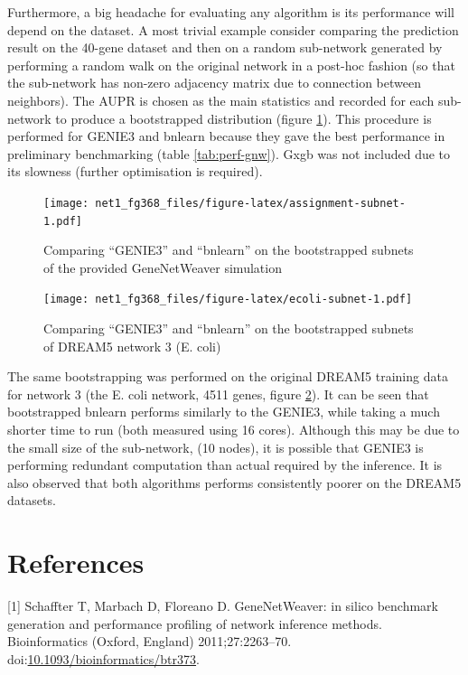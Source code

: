 \documentclass[]{article}
\theoremstyle{definition}
\theoremstyle{definition}
\theoremstyle{definition}
\theoremstyle{remark}
\begin{document}
Furthermore, a big headache for evaluating any algorithm is its
performance will depend on the dataset. A most trivial example consider
comparing the prediction result on the 40-gene dataset and then on a
random sub-network generated by performing a random walk on the original
network in a post-hoc fashion (so that the sub-network has non-zero
adjacency matrix due to connection between neighbors). The AUPR is
chosen as the main statistics and recorded for each sub-network to
produce a bootstrapped distribution (figure
\ref{fig:assignment-subnet}). This procedure is performed for GENIE3 and
bnlearn because they gave the best performance in preliminary
benchmarking (table \ref{tab:perf-gnw}). Gxgb was not included due to
its slowness (further optimisation is required).

\begin{figure}
\centering
\texttt{[image: net1\_fg368\_files/figure-latex/assignment-subnet-1.pdf]}
\caption{\label{fig:assignment-subnet}Comparing ``GENIE3'' and ``bnlearn''
on the bootstrapped subnets of the provided GeneNetWeaver simulation}
\end{figure}

\begin{figure}
\centering
\texttt{[image: net1\_fg368\_files/figure-latex/ecoli-subnet-1.pdf]}
\caption{\label{fig:ecoli-subnet}Comparing ``GENIE3'' and ``bnlearn'' on the
bootstrapped subnets of DREAM5 network 3 (E. coli)}
\end{figure}

The same bootstrapping was performed on the original DREAM5 training
data for network 3 (the E. coli network, 4511 genes, figure
\ref{fig:ecoli-subnet}). It can be seen that bootstrapped bnlearn
performs similarly to the GENIE3, while taking a much shorter time to
run (both measured using 16 cores). Although this may be due to the
small size of the sub-network, (10 nodes), it is possible that GENIE3 is
performing redundant computation than actual required by the inference.
It is also observed that both algorithms performs consistently poorer on
the DREAM5 datasets.

\section{References}\label{references}

\hypertarget{refs}{}
\hypertarget{ref-gnw}{}
{[}1{]} Schaffter T, Marbach D, Floreano D. GeneNetWeaver: in silico
benchmark generation and performance profiling of network inference
methods. Bioinformatics (Oxford, England) 2011;27:2263--70.
doi:\href{https://doi.org/10.1093/bioinformatics/btr373}{10.1093/bioinformatics/btr373}.
\end{document}
